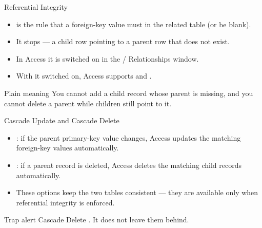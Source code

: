 \documentclass[aspectratio=169]{beamer}
\begin{document}
\begin{frame}{Referential Integrity}
  \begin{itemize}
    \item {} is the rule that a foreign-key value
      must  in the related table
      (or be blank).
    \item It stops  --- a child row pointing to a parent
      row that does not exist.
    \item In Access it is switched on in the  /
      Relationships window.
    \item With it switched on, Access supports  and
      .
  \end{itemize}
  \begin{block}{Plain meaning}
    You cannot add a child record whose parent is missing, and you cannot
    delete a parent while children still point to it.
  \end{block}
\end{frame}

\begin{frame}{Cascade Update and Cascade Delete}
  \begin{itemize}
    \item {}: if the parent primary-key value changes,
      Access updates the matching foreign-key values automatically.
    \item {}: if a parent record is deleted, Access deletes
      the matching child records automatically.
    \item These options keep the two tables consistent --- they are available
      only when referential integrity is enforced.
  \end{itemize}
  \begin{alertblock}{Trap alert}
    Cascade Delete . It does not leave
    them behind.
  \end{alertblock}
\end{frame}
\end{document}
